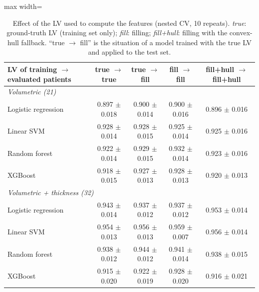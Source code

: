 \begin{table}[!htb]
\centering
\small
\setlength{\tabcolsep}{4pt}
\begin{adjustbox}{max width=\linewidth}
\begin{tabular}{lcccc}
\toprule
LV of training $\to$ evaluated patients & true $\to$ true & true $\to$ fill & fill $\to$ fill & fill+hull $\to$ fill+hull\\
\midrule
\multicolumn{5}{l}{\emph{Volumetric (21)}}\\
\quad Logistic regression & 0.897 $\pm$ 0.018 & 0.900 $\pm$ 0.014 & 0.900 $\pm$ 0.016 & 0.896 $\pm$ 0.016\\
\quad Linear SVM & 0.928 $\pm$ 0.014 & 0.928 $\pm$ 0.015 & 0.925 $\pm$ 0.014 & 0.925 $\pm$ 0.016\\
\quad Random forest & 0.922 $\pm$ 0.014 & 0.929 $\pm$ 0.015 & 0.932 $\pm$ 0.014 & 0.923 $\pm$ 0.016\\
\quad XGBoost & 0.918 $\pm$ 0.015 & 0.927 $\pm$ 0.013 & 0.928 $\pm$ 0.013 & 0.920 $\pm$ 0.013\\
\multicolumn{5}{l}{\emph{Volumetric + thickness (32)}}\\
\quad Logistic regression & 0.943 $\pm$ 0.014 & 0.937 $\pm$ 0.012 & 0.937 $\pm$ 0.012 & 0.953 $\pm$ 0.014\\
\quad Linear SVM & 0.954 $\pm$ 0.013 & 0.956 $\pm$ 0.013 & 0.959 $\pm$ 0.007 & 0.956 $\pm$ 0.014\\
\quad Random forest & 0.938 $\pm$ 0.012 & 0.944 $\pm$ 0.012 & 0.941 $\pm$ 0.014 & 0.938 $\pm$ 0.015\\
\quad XGBoost & 0.915 $\pm$ 0.020 & 0.922 $\pm$ 0.019 & 0.928 $\pm$ 0.020 & 0.916 $\pm$ 0.021\\
\bottomrule
\end{tabular}
\end{adjustbox}
\caption{Effect of the LV used to compute the features (nested CV, 10 repeats). \emph{true}: ground-truth LV
(training set only); \emph{fill}: filling; \emph{fill+hull}: filling with the convex-hull fallback.
``true $\to$ fill'' is the situation of a model trained with the true LV and applied to the test set.}
\label{tab:protocol}
\end{table}
